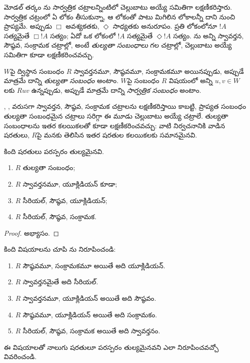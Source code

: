 \documentclass[../../../include/open-logic-section]{subfiles}
\begin{document}


మోడల్ తర్కం ను సార్వత్రిక చట్రాలన్నింటిలో
చెల్లుబాటు అయ్యే  సమితిగా
లక్షణీకరిస్తారు. సార్వత్రిక చట్రంలో ఏ లోకం తీసుకున్నా,
ఆ లోకంతో పాటు మిగిలిన లోకాలన్నీ దాని నుంచి ప్రాప్యమే. అప్పుడు $\Box$
అవశ్యకతకు, $\Diamond$ సాధ్యతకు అనురూపం. ప్రతి
లోకంలోనూ $!A$ సత్యమైతే $\Box !A$ సత్యం;
ఏదో ఒక లోకంలో $!A$ సత్యమైతే $\Diamond !A$ సత్యం.
ను అన్ని స్వావర్తన, సౌష్ఠవ, సంక్రామక
చట్రాల్లో, అంటే \emph{తుల్యతా సంబంధాలు} గల చట్రాల్లో,
చెల్లుబాటు అయ్యే  సమితిగా
కూడా లక్షణీకరించవచ్చు.

\begin{defn}
  $W$పై ద్విస్థాన సంబంధం $R$ స్వావర్తనమూ,
  సౌష్ఠవమూ, సంక్రామకమూ అయినప్పుడు, అప్పుడే మాత్రమే
  దాన్ని \emph{తుల్యతా సంబంధం} అంటాం. $W$పై సంబంధం
  $R$ విషయంలో అన్ని $u,v \in W$లకు $Ruv$ ఉన్నప్పుడు, అప్పుడే మాత్రమే
  దాన్ని \emph{సార్వత్రిక సంబంధం} అంటాం.
\end{defn}

, ,  వరుసగా స్వావర్తన,
సౌష్ఠవ, సంక్రామక చట్రాలను లక్షణీకరిస్తాయి కాబట్టి,
ప్రాప్యత సంబంధం తుల్యతా సంబంధమైన చట్రాలు సరిగ్గా
ఈ మూడు  చెల్లుబాటు అయ్యే
చట్రాలే. తుల్యతా సంబంధాలను ఇతర
 కలయికలతో కూడా
లక్షణీకరించవచ్చు: వాటి నిర్వచనానికి వాడిన షరతులు,
$R$పై మనకు తెలిసిన ఇతర షరతుల కలయికలకు సమానమైనవి.

\begin{prop}
  కింది షరతులు పరస్పరం తుల్యమైనవి.
  \begin{enumerate}
  \item $R$ తుల్యతా సంబంధం;
  \item $R$ స్వావర్తనమూ, యూక్లిడియన్ కూడా;
  \item $R$ సీరియల్, సౌష్ఠవ, యూక్లిడియన్;
  \item $R$ సీరియల్, సౌష్ఠవ, సంక్రామక.
  \end{enumerate}
\end{prop}

\begin{proof}
  అభ్యాసం.
\end{proof}

\begin{prob}
  కింది విషయాలను చూపి
  ను నిరూపించండి:
  \begin{enumerate}
  \item $R$ సౌష్ఠవమూ, సంక్రామకమూ అయితే అది యూక్లిడియన్.
  \item $R$ స్వావర్తనమైతే అది సీరియల్.
  \item $R$ స్వావర్తనమూ, యూక్లిడియన్ అయితే అది సౌష్ఠవం.
  \item $R$ సౌష్ఠవమూ, యూక్లిడియన్ అయితే అది సంక్రామకం.
  \item $R$ సీరియల్, సౌష్ఠవ, సంక్రామక అయితే అది స్వావర్తనం.
  \end{enumerate}
  ఈ విషయాలతో నాలుగు షరతులూ పరస్పరం తుల్యమైనవని
  ఎలా నిరూపించవచ్చో వివరించండి.
\end{prob}
\end{document}
